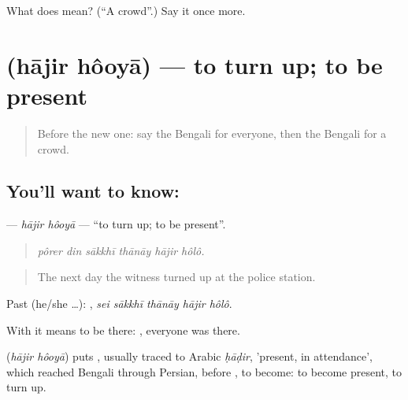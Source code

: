 \begin{tcolorbox}[breakable,colback=teal!4,colframe=teal!35!black,title={Before you move on}]
What does  mean? (\textquotedblleft{}A crowd\textquotedblright{}.) Say it once more.
\end{tcolorbox}
\section[\texorpdfstring{\bn{হাজির} \bn{হওয়া} (hājir hôoyā)}{হাজির হওয়া (hājir hôoyā)}]{  (hājir hôoyā) — to turn up; to be present}

\label{lesson:BN-C277-hajir-hooya}



\begin{quote}
Before the new one: say the Bengali for everyone, then the Bengali for a crowd.
\end{quote}

\subsection*{You'll want to know:  }
\textbf{ } — \emph{hājir hôoyā} — \textquotedblleft{}to turn up; to be present\textquotedblright{}.

\begin{quote}
     
\end{quote}

\begin{quote}
\emph{pôrer din sākkhī thānāy hājir hôlô.}
\end{quote}

\begin{quote}
The next day the witness turned up at the police station.
\end{quote}

Past (he/she …):     , \emph{sei sākkhī thānāy hājir hôlô}.

With  it means to be there:   , everyone was there.

\begin{cousinweb}
\textbf{ } (\emph{hājir hôoyā}) puts , usually traced to Arabic \emph{ḥāḍir}, 'present, in attendance', which reached Bengali through Persian, before , to become: to become present, to turn up.
\end{cousinweb}

